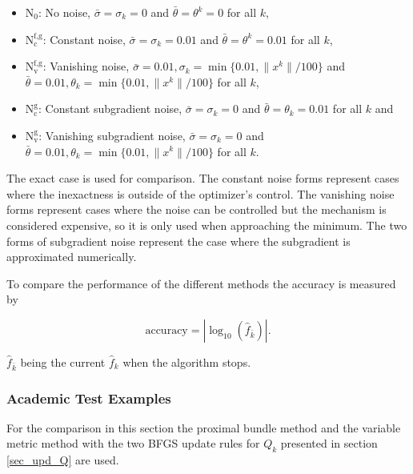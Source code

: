 \begin{itemize}[label={--}]
	\item \(\text{N}_0\): No noise, \(\bar{\sigma}=\sigma_k=0\) and \(\bar{\theta}=\theta^k=0\) for all \(k\),
	\item \(\text{N}_{\text{c}}^{\text{f,g}}\): Constant noise, \(\bar{\sigma}=\sigma_k=0.01\) and \(\bar{\theta}=\theta^k=0.01\) for all \(k\),
	\item \(\text{N}_{\text{v}}^{\text{f,g}}\): Vanishing noise, \(\bar{\sigma}=0.01, \sigma_k = \min\{0.01,\|x^k\|/100\}\) and \(\bar{\theta}=0.01, \theta_k=\min\{0.01,\|x^k\|/100\}\) for all \(k\),
	\item \(\text{N}_{\text{c}}^{\text{g}}\): Constant subgradient noise, \(\bar{\sigma}=\sigma_k=0\) and \(\bar{\theta}=\theta_k=0.01\) for all \(k\) and 
	\item \(\text{N}_{\text{v}}^{\text{g}}\): Vanishing subgradient noise, \(\bar{\sigma}=\sigma_k=0\) and \(\bar{\theta}=0.01, \theta_k=\min\{0.01,\|x^k\|/100\}\) for all \(k\).
\end{itemize}
The exact case is used for comparison. The constant noise forms represent cases where the inexactness is outside of the optimizer's control. The vanishing noise forms represent cases where the noise can be controlled  but the mechanism is considered expensive, so it is only used when approaching the minimum.
The two forms of subgradient noise represent the case where the subgradient is approximated numerically.


To compare the performance of the different methods the accuracy is measured by

\[ \text{accuracy} = |\log_{10}(\hat{f}_{\bar{k}})|. \]

\(\hat{f}_{\bar{k}}\) being the current \(\hat{f}_k\) when the algorithm stops.



\subsubsection{Academic Test Examples}

For the comparison in this section the proximal bundle method and the variable metric method with the two BFGS update rules for \(Q_k\) presented in section \ref{sec_upd_Q} are used. %

